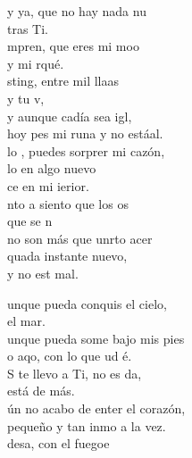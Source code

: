 \begin{cancion}%
	y ya, que no hay nada nu  \\
	tras  Ti.\\
	mpren, que eres mi moo \\
	y mi rqué.\\
	sting, entre mil llaas \\
	y tu v,\\
	y aunque cadía sea igl,\\
	hoy pes mi runa y no estáal.\\
	\jump
	lo , puedes sorprer mi cazón,\\
	lo en  algo nuevo \\
	ce en mi ierior.\\
	nto a  siento que los os \\
	que se n\\
	no son más que unrto acer\\
	quada instante  nuevo, \\
	y no est mal.\jump\\
	\begin{chorus}%
		unque pueda conquis el cielo, \\
	\jump
	el mar.\\
		unque pueda some bajo mis pies\\
		o aqo, con lo que ud é. \\
		S te llevo a Ti, no es da, \\
	\jump
	está de más.\\
		ún no acabo de enter el corazón,\\
		 pequeño y tan inmo a la vez.\\
		desa, con el fuegoe \\

\end{chorus}
\end{cancion}
